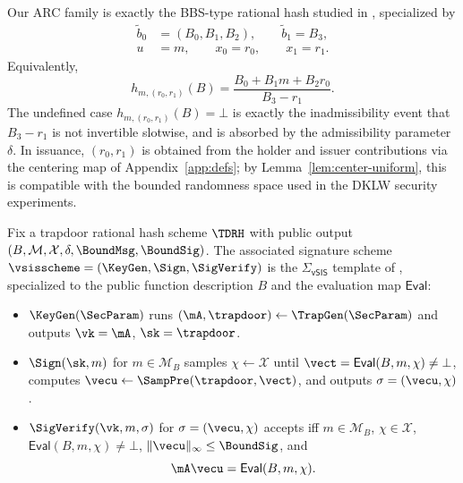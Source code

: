 \begin{remark}\label{rem:hash-notation-match}
Our ARC family is exactly the BBS-type rational hash studied in \cite[Table~1]{EPRINT:DKLW25}, specialized by
\[
\begin{aligned}
  \tilde b_0&=(B_0,B_1,B_2),\qquad \tilde b_1=B_3,\\
  u&=m,\qquad x_0=r_0,\qquad x_1=r_1.
\end{aligned}
\]
Equivalently,
\[
  h_{m,(r_0,r_1)}(B)
  =\frac{B_0+B_1m+B_2r_0}{B_3-r_1}.
\]
The undefined case \(h_{m,(r_0,r_1)}(B)=\bot\) is exactly the inadmissibility event that \(B_3-r_1\) is not invertible
slotwise, and is absorbed by the admissibility parameter \(\delta\). In issuance, \((r_0,r_1)\) is obtained from the
holder and issuer contributions via the centering map of Appendix~\ref{app:defs}; by
Lemma~\ref{lem:center-uniform}, this is compatible with the bounded randomness space used in the DKLW security
experiments.
\end{remark}

\begin{definition}\label{def:vsis-template}
Fix a trapdoor rational hash scheme \(\TDRH\) with public output
\((B,\mathcal{M},\mathcal{X},\delta,\BoundMsg,\BoundSig)\). The associated signature scheme
\(\vsisscheme=(\KeyGen,\Sign,\SigVerify)\) is the \(\Sigma_{\mathsf{vSIS}}\) template of
\cite[Figure~4 and Section~4.1]{EPRINT:DKLW25}, specialized to the public function description \(B\) and the
evaluation map \(\mathsf{Eval}\):
\begin{itemize}[leftmargin=1.25em]
  \item \(\KeyGen(\SecParam)\) runs \((\mA,\trapdoor)\gets \TrapGen(\SecParam)\) and outputs
  \(\vk=\mA\), \(\sk=\trapdoor\).
  \item \(\Sign(\sk,m)\) for \(m\in\mathcal{M}_B\) samples \(\chi\gets\mathcal{X}\) until
  \(\vect=\mathsf{Eval}(B,m,\chi)\neq\bot\), computes \(\vecu\gets \SampPre(\trapdoor,\vect)\), and outputs
  \(\sigma=(\vecu,\chi)\).
  \item \(\SigVerify(\vk,m,\sigma)\) for \(\sigma=(\vecu,\chi)\) accepts iff \(m\in\mathcal{M}_B\),
  \(\chi\in\mathcal{X}\), \(\mathsf{Eval}(B,m,\chi)\neq\bot\), \(\|\vecu\|_\infty\le \BoundSig\), and
  \[
    \mA\vecu=\mathsf{Eval}(B,m,\chi).
  \]
\end{itemize}
\end{definition}

